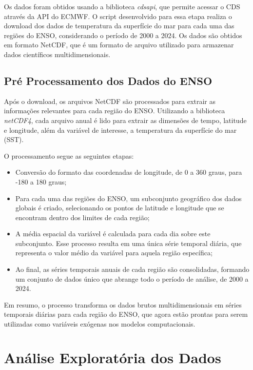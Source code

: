 Os dados foram obtidos usando a biblioteca \textit{cdsapi}, que permite acessar o CDS através da
API do ECMWF. O script desenvolvido para essa etapa realiza o download dos dados de temperatura da superfície do mar
para cada uma das regiões do ENSO, considerando o período de 2000 a 2024. Os dados são obtidos em formato NetCDF, que é 
um formato de arquivo utilizado para armazenar dados científicos multidimensionais.

\subsection{Pré Processamento dos Dados do ENSO} %
Após o download, os arquivos NetCDF são processados para extrair as informações relevantes para cada região do ENSO. 
Utilizando a biblioteca \textit{netCDF4}, cada arquivo anual é lido para extrair as dimensões de tempo, latitude e longitude, 
além da variável de interesse, a temperatura da superfície do mar (SST).

O processamento segue as seguintes etapas:
\begin{itemize}
\item Conversão do formato das coordenadas de longitude, de 0 a 360 graus, para -180 a 180 graus;
\item Para cada uma das regiões do ENSO, um subconjunto geográfico dos dados globais é criado, selecionando os pontos
de latitude e longitude que se encontram dentro dos limites de cada região;
\item A média espacial da variável é calculada para cada dia sobre este subconjunto. Esse processo resulta em uma única série
temporal diária, que representa o valor médio da variável para aquela região específica;
\item Ao final, as séries temporais anuais de cada região são consolidadas, formando um conjunto de dados único que abrange
todo o período de análise, de 2000 a 2024.
\end{itemize}

Em resumo, o processo transforma os dados brutos multidimensionais em séries temporais diárias para cada região
do ENSO, que agora estão prontas para serem utilizadas como variáveis exógenas nos modelos computacionais.


\section{Análise Exploratória dos Dados} %

